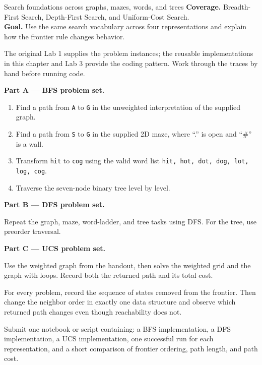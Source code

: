 
\begin{labproject}{Search foundations across graphs, mazes, words, and trees}
\textbf{Coverage.} Breadth-First Search, Depth-First Search, and Uniform-Cost Search.\\
\textbf{Goal.} Use the same search vocabulary across four representations and explain how the frontier rule changes behavior.

\begin{labmode}
The original Lab 1 supplies the problem instances; the reusable implementations in this chapter and Lab 3 provide the coding pattern. Work through the traces by hand before running code.
\end{labmode}

\medskip\noindent\textbf{Part A --- BFS problem set.}\par
\begin{enumerate}
  \item Find a path from \texttt{A} to \texttt{G} in the unweighted interpretation of the supplied graph.
  \item Find a path from \texttt{S} to \texttt{G} in the supplied 2D maze, where ``.'' is open and ``\#'' is a wall.
  \item Transform \texttt{hit} to \texttt{cog} using the valid word list \texttt{hit, hot, dot, dog, lot, log, cog}.
  \item Traverse the seven-node binary tree level by level.
\end{enumerate}

\medskip\noindent\textbf{Part B --- DFS problem set.}\par
Repeat the graph, maze, word-ladder, and tree tasks using DFS. For the tree, use preorder traversal.

\medskip\noindent\textbf{Part C --- UCS problem set.}\par
Use the weighted graph from the handout, then solve the weighted grid and the graph with loops. Record both the returned path and its total cost.

\begin{tryit}
For every problem, record the sequence of states removed from the frontier. Then change the neighbor order in exactly one data structure and observe which returned path changes even though reachability does not.
\end{tryit}
\end{labproject}

\begin{labdeliverable}
Submit one notebook or script containing: a BFS implementation, a DFS implementation, a UCS implementation, one successful run for each representation, and a short comparison of frontier ordering, path length, and path cost.
\end{labdeliverable}
